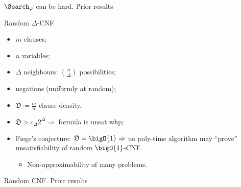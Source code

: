 \begin{frame}{$\Search_{\varphi}$ can be hard. Prior results}
    
\end{frame}


\begin{frame}{Random $\Delta$-CNF}

    \begin{minipage}{0.38\linewidth}
        \centering
        
    \end{minipage}
    \begin{minipage}{0.58\linewidth}
        \begin{itemize}
            \item $m$ clauses;
            \item $n$ variables;
            \item $\Delta$ neighbours: $\binom{n}{\Delta}$ possibilities;
            \item negations (uniformly at random);
            \item $\mathfrak{D} \coloneqq \frac{m}{n}$ clause density.
        \end{itemize}
    \end{minipage}

    \pause
    \begin{itemize}
        \item $\mathfrak{D} > c_{\Delta} 2^{\Delta} \Rightarrow$ formula is unsat whp;
            \pause
        \item Fiege's conjecture: $\mathfrak{D} = \bigO{1} \Rightarrow$ no poly-time algorithm may
            ``prove'' unsatisfiability of random $\bigO{1}$-CNF.
            \begin{itemize}
                \item Non-approximability of many problems.
            \end{itemize}
    \end{itemize}

\end{frame}


\begin{frame}{Random CNF. Proir results}
    
\end{frame}